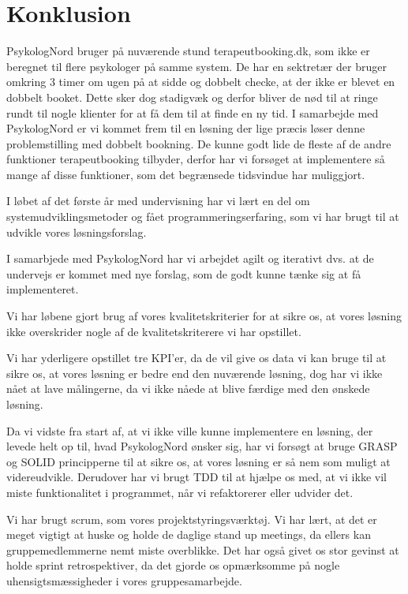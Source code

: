 \section{Konklusion}
PsykologNord bruger på nuværende stund terapeutbooking.dk, som ikke er beregnet til flere psykologer på samme system.
De har en sektretær der bruger omkring 3 timer om ugen på at sidde og dobbelt checke, at der ikke er blevet en dobbelt booket.
Dette sker dog stadigvæk og derfor bliver de nød til at ringe rundt til nogle klienter for at få dem til at finde en ny tid.
I samarbejde med PsykologNord er vi kommet frem til en løsning der lige præcis løser denne problemstilling med dobbelt bookning.
De kunne godt lide de fleste af de andre funktioner terapeutbooking tilbyder, derfor har vi forsøget at implementere så mange af disse funktioner, som det begrænsede tidsvindue har muliggjort.

I løbet af det første år med undervisning har vi lært en del om systemudviklingsmetoder og fået programmeringserfaring, som vi har brugt til at udvikle vores løsningsforslag.

I samarbjede med PsykologNord har vi arbejdet agilt og iterativt dvs. at de undervejs er kommet med nye forslag, som de godt kunne tænke sig at få implementeret.

Vi har løbene gjort brug af vores kvalitetskriterier for at sikre os, at vores løsning ikke overskrider nogle af de kvalitetskriterere vi har opstillet.

Vi har yderligere opstillet tre KPI'er, da de vil give os data vi kan bruge til at sikre os, at vores løsning er bedre end den nuværende løsning, dog har vi ikke nået at lave målingerne, da vi ikke nåede at blive færdige med den ønskede løsning.

Da vi vidste fra start af, at vi ikke ville kunne implementere en løsning, der levede helt op til, hvad PsykologNord ønsker sig, har vi forsøgt at bruge GRASP og SOLID principperne til at sikre os, at vores løsning er så nem som muligt at videreudvikle.
Derudover har vi brugt TDD til at hjælpe os med, at vi ikke vil miste funktionalitet i programmet, når vi refaktorerer eller udvider det.

Vi har brugt scrum, som vores projektstyringsværktøj.
Vi har lært, at det er meget vigtigt at huske og holde de daglige stand up meetings, da ellers kan gruppemedlemmerne nemt miste overblikke.
Det har også givet os stor gevinst at holde sprint retrospektiver, da det gjorde os opmærksomme på nogle uhensigtsmæssigheder i vores gruppesamarbejde.